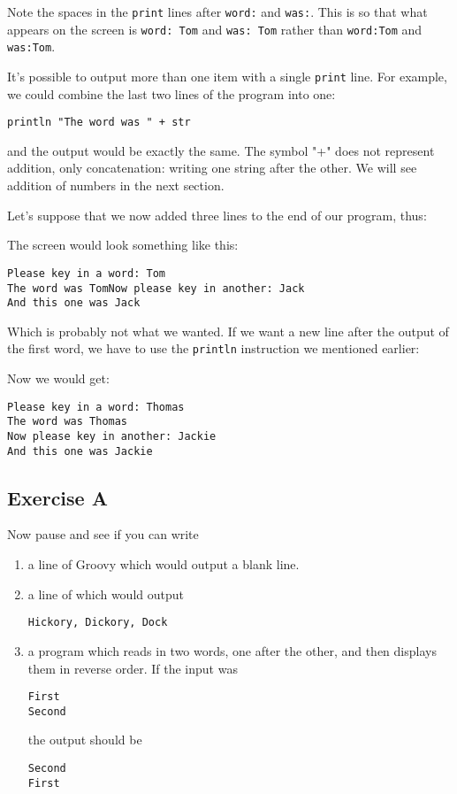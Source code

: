 Note the spaces in the \verb!print! lines after \verb!word:! and \verb!was:!.
This is so that what appears on the screen is \verb!word: Tom! and
\verb!was: Tom! rather than \verb!word:Tom! and \verb!was:Tom!.

It's possible to output more than one item with a single \verb!print! line.
For example, we could combine the last two lines of the program into one:

\begin{Verbatim}
println "The word was " + str
\end{Verbatim}

and the output would be exactly the same. The symbol "+" does not
represent addition, only concatenation: writing one string after the
other. We will see addition of numbers in the next section.

Let's suppose that we now added three lines to the end of our program, thus:


The screen would look something like this:
\begin{Verbatim}
Please key in a word: Tom
The word was TomNow please key in another: Jack
And this one was Jack
\end{Verbatim}

Which is probably not what we wanted.  If we want a new line after the
output of the first word, we have to use the \verb!println! instruction we mentioned earlier:


Now we would get:
\begin{Verbatim}
Please key in a word: Thomas
The word was Thomas
Now please key in another: Jackie
And this one was Jackie
\end{Verbatim}


\subsection*{Exercise A}

Now pause and see if you can write
\begin{enumerate}
\item
a line of Groovy which would output a blank line.
\item
a line of  which would output

\begin{Verbatim}
Hickory, Dickory, Dock
\end{Verbatim}

\item
a program which reads in two words, one after the other, and then displays them
in reverse order. If the input was 

\begin{Verbatim}
First
Second
\end{Verbatim}

the output should be

\begin{Verbatim}
Second
First
\end{Verbatim}

\end{enumerate}

